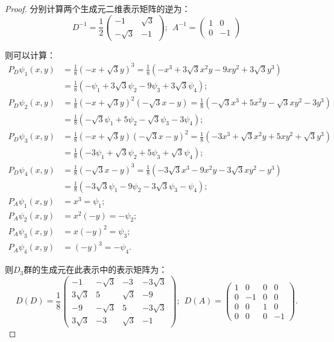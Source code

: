 \documentclass[reqno,a4paper,12pt]{amsart}
\begin{document}
\begin{enumerate}[1.]
\begin{proof}
分别计算两个生成元二维表示矩阵的逆为：
\[
	D^{-1} = \frac{1}{2} \left( \begin{matrix}
		-1 & \sqrt{3} \\
		-\sqrt{3} & -1
	\end{matrix} \right); \ \
	A^{-1} = \left( \begin{matrix}
		1 & 0 \\
		0 & -1
	\end{matrix} \right)
\]

则可以计算：
\begin{align*}
	P_D \psi_1(x, y) &= \frac{1}{8}(-x+\sqrt{3}y)^3 = \frac{1}{8} (-x^3 + 3\sqrt{3} x^2y - 9 xy^2 + 3\sqrt{3}y^3) \\
	&= \frac{1}{8}(-\psi_1 + 3\sqrt{3}\psi_2 - 9\psi_3 + 3\sqrt{3}\psi_4); \\
	P_D \psi_2(x, y) &= \frac{1}{8}(-x+\sqrt{3}y)^2(-\sqrt{3}x-y) = \frac{1}{8} (-\sqrt{3}x^3 + 5x^2y - \sqrt{3}xy^2 - 3y^3) \\
	&= \frac{1}{8}(-\sqrt{3}\psi_1 + 5\psi_2 - \sqrt{3}\psi_3 - 3\psi_4); \\
	P_D \psi_3(x, y) &= \frac{1}{8}(-x+\sqrt{3}y)(-\sqrt{3}x-y)^2 = \frac{1}{8}(-3x^3 + \sqrt{3}x^2y + 5 xy^2 + \sqrt{3}y^3) \\
	&= \frac{1}{8}(-3\psi_1 + \sqrt{3}\psi_2 + 5\psi_3 + \sqrt{3}\psi_4); \\
	P_D \psi_4(x, y) &= \frac{1}{8}(-\sqrt{3}x-y)^3 = \frac{1}{8} (-3\sqrt{3} x^3 - 9 x^2y - 3\sqrt{3} xy^2 - y^3) \\
	&= \frac{1}{8}(-3\sqrt{3}\psi_1 - 9\psi_2 - 3\sqrt{3}\psi_3 - \psi_4); \\
	P_A\psi_1(x, y) &= x^3 = \psi_1; \\
	P_A\psi_2(x, y) &= x^2(-y) = -\psi_2; \\
	P_A\psi_3(x, y) &= x(-y)^2 = \psi_3; \\
	P_A\psi_4(x, y) &= (-y)^3 = -\psi_4. 
\end{align*}

则$D_3$群的生成元在此表示中的表示矩阵为：
\[
	D(D) = \frac{1}{8} \left( \begin{matrix}
		-1 & -\sqrt{3} & -3 & -3\sqrt{3} \\
		3\sqrt{3} & 5 & \sqrt{3} & -9 \\
		-9 & -\sqrt{3} & 5 & -3\sqrt{3} \\
		3\sqrt{3} & -3 & \sqrt{3} & -1
	\end{matrix} \right); \ \ 
	D(A) = \left( \begin{matrix}
		1 & 0 & 0 & 0 \\
		0 & -1 & 0 & 0 \\
		0 & 0 & 1 & 0 \\
		0 & 0 & 0 & -1
	\end{matrix} \right).
\]


\end{proof}
\end{enumerate}
\end{document}
